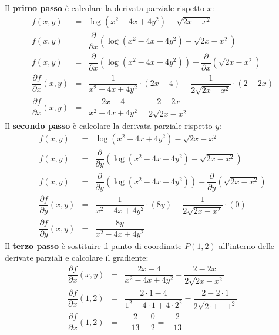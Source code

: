 \documentclass[a4paper]{article}
\begin{document}
	\noindent
	Il \textbf{primo passo} è calcolare la derivata parziale rispetto $x$:
	\begin{equation*}
		\begin{array}{rcl}
			f\left(x,y\right) &=& \log\left(x^{2} - 4x + 4y^{2}\right) - \sqrt{2x - x^{2}} \\ [.5em]
			f\left(x,y\right) &=& \dfrac{\partial}{\partial x} \left(\log\left(x^{2} - 4x + 4y^{2}\right) - \sqrt{2x - x^{2}}\right) \\ [1.5em]
			f\left(x,y\right) &=& \dfrac{\partial}{\partial x}\left(\log\left(x^{2}-4x+4y^{2}\right)\right) - \dfrac{\partial}{\partial x}\left(\sqrt{2x-x^{2}}\right) \\ [1.5em]
			\dfrac{\partial f}{\partial x}\left(x,y\right) &=& \dfrac{1}{x^{2}-4x+4y^{2}} \cdot \left(2x - 4\right) - \dfrac{1}{2\sqrt{2x-x^{2}}} \cdot \left(2-2x\right) \\ [1.5em]
			\dfrac{\partial f}{\partial x}\left(x,y\right) &=& \dfrac{2x - 4}{x^{2}-4x+4y^{2}} - \dfrac{2-2x}{2\sqrt{2x-x^{2}}}
		\end{array}
	\end{equation*}
	Il \textbf{secondo passo} è calcolare la derivata parziale rispetto $y$:
	\begin{equation*}
		\begin{array}{rcl}
			f\left(x,y\right) &=& \log\left(x^{2} - 4x + 4y^{2}\right) - \sqrt{2x - x^{2}} \\ [.5em]
			f\left(x,y\right) &=& \dfrac{\partial}{\partial y} \left(\log\left(x^{2} - 4x + 4y^{2}\right) - \sqrt{2x - x^{2}}\right) \\ [1.5em]
			f\left(x,y\right) &=& \dfrac{\partial}{\partial y}\left(\log\left(x^{2}-4x+4y^{2}\right)\right) - \dfrac{\partial}{\partial y}\left(\sqrt{2x-x^{2}}\right) \\ [1.5em]
			\dfrac{\partial f}{\partial y}\left(x,y\right) &=& \dfrac{1}{x^{2}-4x+4y^{2}} \cdot \left(8y\right) - \dfrac{1}{2\sqrt{2x-x^{2}}} \cdot \left(0\right) \\ [1.5em]
			\dfrac{\partial f}{\partial y}\left(x,y\right) &=& \dfrac{8y}{x^{2} - 4x + 4y^{2}}
		\end{array}
	\end{equation*}
	Il \textbf{terzo passo} è sostituire il punto di coordinate $P\left(1,2\right)$ all'interno delle derivate parziali e calcolare il gradiente:
	\begin{equation*}
		\begin{array}{rcl}
			\dfrac{\partial f}{\partial x}\left(x,y\right) &=& \dfrac{2x - 4}{x^{2}-4x+4y^{2}} - \dfrac{2-2x}{2\sqrt{2x-x^{2}}} \\ [1.5em]
			\dfrac{\partial f}{\partial x}\left(1,2\right) &=& \dfrac{2 \cdot 1 - 4}{1^{2}-4 \cdot 1+4 \cdot 2^{2}} - \dfrac{2-2 \cdot 1}{2\sqrt{2 \cdot 1- 1^{2}}} \\ [1.5em]
			\dfrac{\partial f}{\partial x}\left(1,2\right) &=& -\dfrac{2}{13} - \dfrac{0}{2} = -\dfrac{2}{13}
		\end{array}
	\end{equation*}\newpage
\end{document}
